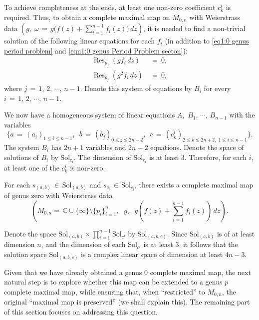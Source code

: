 \documentclass[12pt]{amsart}
\numberwithin{equation}{section}
\begin{document}
To achieve completeness at the ends, at least one non-zero coefficient \(c_k^i\) is required. Thus, to obtain a
complete maximal map on \(M_{0,n}\) with Weierstrass data \(\left(g, \; \omega \,=\,
g\big(f(z) + \sum_{i=1}^{n-1} f_i(z)\big)\, dz\right)\), it is needed to find a non-trivial solution
of the following linear
equations for each \(f_i\) (in addition to \eqref{eq1:0 genus period problem} and
\eqref{eqn1:0 genus Period Problem secton}):
\begin{align}
\label{eq 4.5:completeness 1}
\operatorname{Res}_{p_j}(g f_i \, dz) &\ =\ 0,\\
\label{eq 4.6:completeness 2}
\operatorname{Res}_{p_j}(g^2 f_i \, dz) &\ =\ 0,
\end{align}
where $j\,=\,1,\,2,\,\cdots,\,n-1$. Denote this system of equations by \(B_i\) for every
\(i \,=\, 1,\, 2,\, \cdots,\, n-1\).

We now have a homogeneous system of linear equations \(A\),\, \(B_1,\, \cdots,\, B_{n-1}\) with the variables
$$\{a \,=\, (a_i)_{1 \leq i \leq n-1},\ \; b \,=\, (b_j)_{0 \leq j \leq 2n-2},\ \; c \,=
\,(c_k^i)_{2 \leq k \leq 2n+2, \; 1 \leq i \leq n-1}\}.$$
The system \(B_i\) has \(2n+1\) variables and \(2n-2\) equations.
Denote the space of solutions of \(B_i\) by \(\text{Sol}_{c_i}\). The dimension of $\text{Sol}_{c_i}$ is at least $3$. Therefore, for each \(i\), at least one of the \(c_k^i\) is non-zero.

For each \(s_{(a,b)} \,\in\, \text{Sol}_{(a,b)}\) and \(s_{c_i} \,\in\, \text{Sol}_{c_i}\), there exists a complete 
maximal map of genus zero with Weierstrass data
$$(M_{0,n} =\ \mathbb{C} \cup
\{\infty\} \setminus \{p_i\}_{i=1}^n,\,\, \; g,\,\, \;
g (f(z) + \sum_{i=1}^{n-1} f_i(z)) \, dz).$$

Denote the space $\text{Sol}_{(a,b)}\times\prod_{i=1}^{n-1}\text{Sol}_{c^i}$ by $\text{Sol}_{(a,b,c)}$. Since
$\text{Sol}_{(a,b)}$ is of at least dimension $n$, and the dimension of each $\text{Sol}_{c^i}$ is at least $3$,
it follows that the solution space $\text{Sol}_{(a,b,c)}$ is a complex linear space of dimension at least $4n-3.$ 

Given that we have already obtained a genus \(0\) complete maximal map, the next natural step is to explore 
whether this map can be extended to a genus \(p\) complete maximal map, while ensuring that, when ``restricted'' to 
\(M_{0,n}\), the original ``maximal map is preserved'' (we shall explain this). The remaining part of this section 
focuses on addressing this question.
\end{document}
